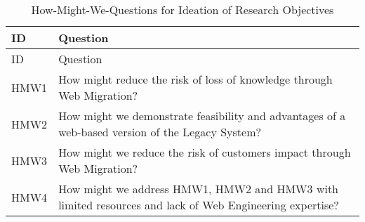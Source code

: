 \hypertarget{tbl:hmw}{}
\begin{longtable}[]{@{}ll@{}}
\caption{\label{tbl:hmw}How-Might-We-Questions for Ideation of Research Objectives}\tabularnewline
\toprule
\begin{minipage}[b]{0.06\columnwidth}\raggedright
ID\strut
\end{minipage} & \begin{minipage}[b]{0.88\columnwidth}\raggedright
Question\strut
\end{minipage}\tabularnewline
\midrule
\endfirsthead
\toprule
\begin{minipage}[b]{0.06\columnwidth}\raggedright
ID\strut
\end{minipage} & \begin{minipage}[b]{0.88\columnwidth}\raggedright
Question\strut
\end{minipage}\tabularnewline
\midrule
\endhead
\begin{minipage}[t]{0.06\columnwidth}\raggedright
HMW1\strut
\end{minipage} & \begin{minipage}[t]{0.88\columnwidth}\raggedright
How might reduce the risk of loss of knowledge through \gls{Web Migration}?\strut
\end{minipage}\tabularnewline
\begin{minipage}[t]{0.06\columnwidth}\raggedright
HMW2\strut
\end{minipage} & \begin{minipage}[t]{0.88\columnwidth}\raggedright
How might we demonstrate feasibility and advantages of a web-based version of the \gls{Legacy System}?\strut
\end{minipage}\tabularnewline
\begin{minipage}[t]{0.06\columnwidth}\raggedright
HMW3\strut
\end{minipage} & \begin{minipage}[t]{0.88\columnwidth}\raggedright
How might we reduce the risk of customers impact through \gls{Web Migration}?\strut
\end{minipage}\tabularnewline
\begin{minipage}[t]{0.06\columnwidth}\raggedright
HMW4\strut
\end{minipage} & \begin{minipage}[t]{0.88\columnwidth}\raggedright
How might we address HMW1, HMW2 and HMW3 with limited resources and lack of \gls{Web Engineering} expertise?\strut
\end{minipage}\tabularnewline
\bottomrule
\end{longtable}




